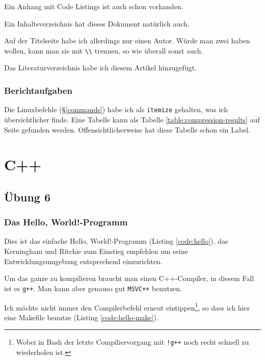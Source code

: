 \documentclass[12pt]{report}
\newcommand\gqq[1]{\glqq #1\grqq}
\begin{document}
Ein Anhang mit Code Listings ist auch schon vorhanden.

Ein Inhaltsverzeichnis hat dieses Dokument natürlich auch.

Auf der Titelseite habe ich allerdings nur einen Autor. Würde man zwei haben wollen, kann man sie mit \verb#\\# trennen, so wie überall sonst auch.

Das Literaturverzeichnis habe ich diesem Artikel hinzugefügt.

\section{Berichtaufgaben}

Die Linuxbefehle (§\ref{commands}) habe ich als \texttt{itemize} gehalten, was ich übersichtlicher finde. Eine Tabelle kann als Tabelle \ref{table:compression-results} auf Seite \pageref{table:compression-results} gefunden werden. Offensichtlicherweise hat diese Tabelle schon ein Label.


\part{C++}

\chapter{Übung 6}

\section{Das \gqq{Hello, World!}-Programm}

Dies ist das einfache \gqq{Hello, World!}-Programm (Listing \ref{code:hello}), das Kerningham und Ritchie zum Einstieg empfehlen um seine Entwicklungsumgebung entsprechend einzurichten.



Um das ganze zu kompilieren braucht man einen C++-Compiler, in diesem Fall ist es \texttt{g++}. Man kann aber genauso gut \texttt{MSVC++} benutzen.

Ich möchte nicht immer den Compilerbefehl erneut eintippen\footnote{Wobei in Bash der letzte Compiliervorgang mit \texttt{!g++} noch recht schnell zu wiederholen ist.}, so dass ich hier eine Makefile benutze (Listing \ref{code:hello-make}).
\end{document}
